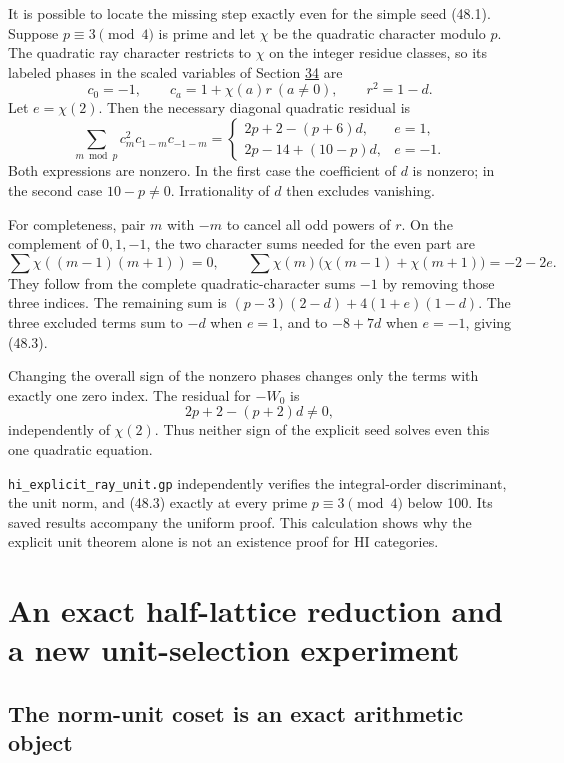\documentclass[11pt,reqno]{amsart}
\theoremstyle{plain}
\begin{document}
It is possible to locate the missing step exactly even for the
simple seed (48.1). Suppose \(p\equiv3\pmod4\) is prime and let
\(\chi\) be the quadratic character modulo \(p\). The quadratic
ray character restricts to \(\chi\) on the integer residue classes,
so its labeled phases in the scaled variables of Section \hyperref[sec:34]{34} are
\[
 c_0=-1,\qquad c_a=1+\chi(a)r\ (a\ne0),
 \qquad r^2=1-d.
\]
Let \(e=\chi(2)\). Then the necessary diagonal quadratic residual is
\begin{equation*}
 \boxed{
 \sum_{m\bmod p}c_m^2c_{1-m}c_{-1-m}
 =\begin{cases}
 2p+2-(p+6)d,&e=1,\\
 2p-14+(10-p)d,&e=-1.
 \end{cases}} \tag{48.3}
\end{equation*}
Both expressions are nonzero. In the first case the coefficient of
\(d\) is nonzero; in the second case \(10-p\ne0\). Irrationality
of \(d\) then excludes vanishing.

For completeness, pair \(m\) with \(-m\) to cancel all odd
powers of \(r\). On the complement of \(0,1,-1\), the two
character sums needed for the even part are
\[
 \sum\chi((m-1)(m+1))=0,
 \qquad
 \sum\chi(m)\bigl(\chi(m-1)+\chi(m+1)\bigr)=-2-2e.
\]
They follow from the complete quadratic-character sums \(-1\)
by removing those three indices. The remaining sum is
\((p-3)(2-d)+4(1+e)(1-d)\). The three excluded terms sum to
\(-d\) when \(e=1\), and to \(-8+7d\) when \(e=-1\), giving
(48.3).

Changing the overall sign of the nonzero phases changes only the
terms with exactly one zero index. The residual for \(-W_0\) is
\[
 2p+2-(p+2)d\ne0,
\]
independently of \(\chi(2)\). Thus neither sign of the explicit
seed solves even this one quadratic equation.

\texttt{hi\_\allowbreak explicit\_\allowbreak ray\_\allowbreak unit.gp} independently verifies the integral-order
discriminant, the unit norm, and (48.3) exactly at every prime
\(p\equiv3\pmod4\) below 100. Its saved results accompany the
uniform proof. This calculation shows why the explicit unit theorem
alone is not an existence proof for HI categories.

\section{An exact half-lattice reduction and a new unit-selection experiment}\label{sec:49}

\subsection{The norm-unit coset is an exact arithmetic object}\label{sec:49.1}
\end{document}
